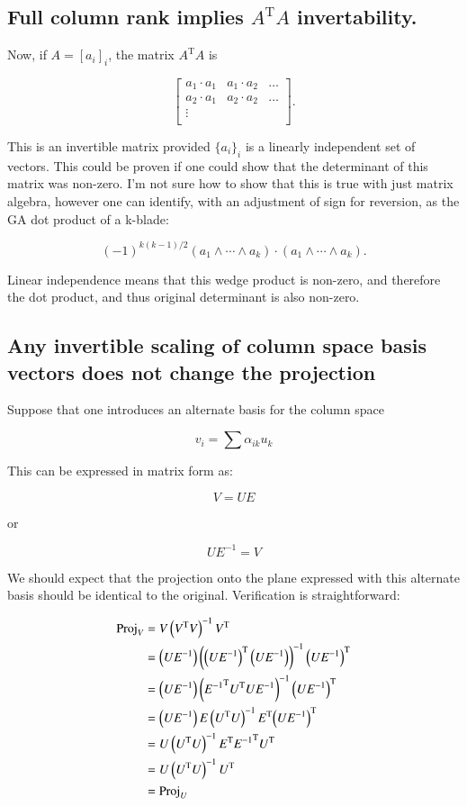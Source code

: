 \documentclass{article}      %
\newcommand{\transpose}[1]{{{#1}^{\text{T}}}}
\begin{document}
\subsection{ Full column rank implies $\transpose{A}A$ invertability. }


Now, if $A = [a_i]_i$, 
the matrix $\transpose{A}A$ is

\[
\begin{bmatrix}
{a_1} \cdot {a_1} & {a_1} \cdot {a_2} & \hdots \\
{a_2} \cdot {a_1} & {a_2} \cdot {a_2} & \hdots \\
\vdots & & \\
\end{bmatrix}.
\]

This is an invertible matrix provided $\{a_i\}_i$ is a linearly independent set of vectors.
This could be proven if one could show that the 
determinant of this matrix was non-zero.
I'm not sure how to show that this is true with just matrix algebra, however
one can identify, with an adjustment of sign for reversion, as 
the GA dot product of a k-blade:

\[
(-1)^{k(k-1)/2} (a_1 \wedge \cdots \wedge a_k) \cdot (a_1 \wedge \cdots \wedge a_k).
\]

Linear independence means that this wedge product is non-zero, and therefore the dot product, and thus original determinant is also non-zero.


\subsection{ Any invertible scaling of column space basis vectors does not change the projection }


Suppose that one introduces an alternate basis for the column space


\[
v_i = \sum \alpha_{ik} u_k
\]

This can be expressed in matrix form as:

\[
V = U E
\]

or

\[
U E^{-1} = V
\]

We should expect that the projection onto the plane expressed with this alternate basis should be identical to the original.  Verification
is straightforward:

\begin{align*}
\Proj_V 
&= V \left(\transpose{V} V\right)^{-1} \transpose{V} \\
&= \left(U E^{-1}\right) \left(\transpose{\left(U E^{-1}\right)} \left(U E^{-1}\right)\right)^{-1} \transpose{\left(U E^{-1}\right)} \\
&= \left(U E^{-1}\right) \left( \transpose{E^{-1}} \transpose{U} U E^{-1}\right)^{-1} \transpose{\left(U E^{-1}\right)} \\
&= \left(U E^{-1}\right) E \left( \transpose{U}U\right)^{-1} \transpose{E} \transpose{\left(U E^{-1}\right)} \\
&= U \left( \transpose{U}U\right)^{-1} \transpose{E} \transpose{E^{-1}} \transpose{U} \\
&= U \left( \transpose{U}U\right)^{-1} \transpose{U} \\
&= \Proj_U
\end{align*}
\end{document}
